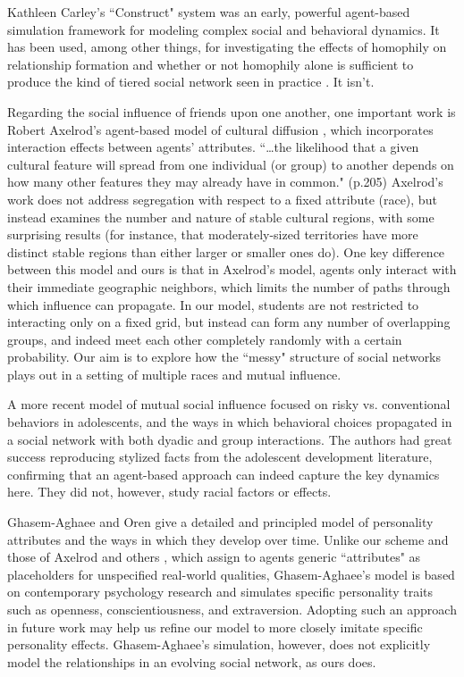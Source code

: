 Kathleen Carley's ``Construct" system
\cite{carley_theory_1991,schreiber_construct-multi-agent_2004} was an early,
powerful agent-based simulation framework for modeling complex social and
behavioral dynamics. It has been used, among other things, for investigating
the effects of homophily on relationship formation and whether or not
homophily alone is sufficient to produce the kind of tiered social network
seen in practice \cite{hirshman_leaving_2011}. It isn't.

Regarding the social influence of friends upon one another, one important work
is Robert Axelrod's agent-based model of cultural diffusion
\cite{axelrod_dissemination_1997}, which incorporates interaction effects
between agents' attributes. ``\dots the likelihood that a given cultural
feature will spread from one individual (or group) to another depends on how
many other features they may already have in common." (p.205) Axelrod's work
does not address segregation with respect to a fixed attribute (race), but
instead examines the number and nature of stable cultural regions, with some
surprising results (for instance, that moderately-sized territories have more
distinct stable regions than either larger or smaller ones do). One key
difference between this model and ours is that in Axelrod's model, agents only
interact with their immediate geographic neighbors, which limits the number of
paths through which influence can propagate. In our model, students are not
restricted to interacting only on a fixed grid, but instead can form any
number of overlapping groups, and indeed meet each other completely randomly
with a certain probability. Our aim is to explore how the ``messy" structure
of social networks plays out in a setting of multiple races and mutual
influence.

A more recent model of mutual social influence \cite{schuhmacher_using_2014}
focused on risky vs. conventional behaviors in adolescents, and the ways in
which behavioral choices propagated in a social network with both dyadic and
group interactions. The authors had great success reproducing stylized facts
from the adolescent development literature, confirming that an agent-based
approach can indeed capture the key dynamics here. They did not, however,
study racial factors or effects.

Ghasem-Aghaee and Oren \citeyear{ghasem-aghaee_cognitive_2007} give a detailed
and principled model of personality attributes and the ways in which they
develop over time. Unlike our scheme and those of Axelrod and others
\cite{epstein_growing_1996}, which assign to agents generic ``attributes" as
placeholders for unspecified real-world qualities, Ghasem-Aghaee's model is
based on contemporary psychology research and simulates specific personality
traits such as openness, conscientiousness, and extraversion. Adopting such an
approach in future work may help us refine our model to more closely imitate
specific personality effects. Ghasem-Aghaee's simulation, however, does not
explicitly model the relationships in an evolving social network, as ours
does.

